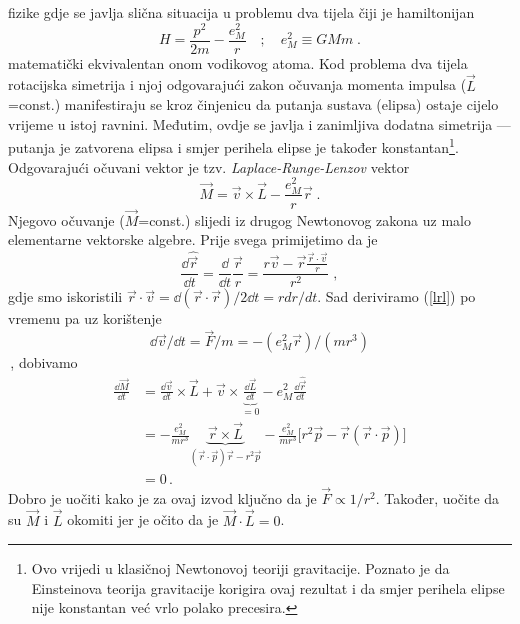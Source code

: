 fizike gdje se javlja slična situacija u problemu dva tijela čiji
je hamiltonijan
\begin{equation}
    H = \frac{p^2}{2m} - \frac{e_{M}^2}{r} \quad ; \quad 
 e_{M}^2 \equiv G M m \;.
\end{equation}
matematički ekvivalentan onom vodikovog atoma.
Kod problema dva tijela rotacijska simetrija i njoj odgovarajući zakon
očuvanja momenta impulsa ($\vec{L}$=const.) manifestiraju se kroz
činjenicu da putanja sustava (elipsa) ostaje cijelo vrijeme u istoj
ravnini.  Međutim, ovdje se javlja i zanimljiva dodatna simetrija ---
putanja je zatvorena elipsa i
smjer perihela elipse je također konstantan\footnote{Ovo
vrijedi u klasičnoj Newtonovoj teoriji gravitacije. Poznato je da
Einsteinova teorija gravitacije korigira ovaj rezultat i da smjer perihela
elipse nije konstantan već vrlo polako precesira.}.
Odgovarajući očuvani vektor je tzv. \emph{Laplace-Runge-Lenzov}
vektor
\begin{equation}
  \vec{M} = \vec{v}\times\vec{L} - \frac{e_{M}^2}{r}\vec{r} \;.
\label{lrl}
\end{equation}
Njegovo očuvanje ($\vec{M}$=const.) slijedi iz drugog Newtonovog
zakona uz malo elementarne vektorske algebre.
Prije svega primijetimo da je
\begin{displaymath}
 \frac{\dd \hat{\vec{r}}}{\dd t} = \frac{\dd}{\dd t} \frac{\vec{r}}{r} =
 \frac{r \vec{v} - \vec{r}
\frac{\vec{r}\cdot\vec{v}}{r}}{r^2} \;,
\end{displaymath}
gdje smo iskoristili $\vec{r}\cdot\vec{v} = \dd (\vec{r}\cdot\vec{r})/2\dd t
= r dr/dt $.
Sad deriviramo (\ref{lrl}) po vremenu pa uz korištenje 
\[ \dd \vec{v}/ \dd t = \vec{F}/m = - (e_{M}^2 \vec{r})/(mr^3) \] \,,
dobivamo
\begin{displaymath}
\begin{split}
\frac{\dd \vec{M}}{\dd t} &=
\frac{\dd \vec{v}}{\dd t} \times \vec{L} + \vec{v}\times
\underbrace{\frac{\dd \vec{L}}{\dd t}}_{=0} - e_{M}^2 \frac{\dd \hat{\vec{r}}}
{\dd t} \\
&= -\frac{e_{M}^2}{mr^3} \underbrace{\vec{r}\times\vec{L}}_{(\vec{r}\cdot 
\vec{p})\vec{r} - r^2 \vec{p}} -
    \frac{e_{M}^2}{mr^3} \Big[ r^2\vec{p} - \vec{r}(\vec{r}\cdot\vec{p})\Big] \\
&= 0 \,.
\end{split}
\end{displaymath}
Dobro je uočiti kako je za ovaj izvod ključno da je $\vec{F}\propto 1/r^2$.
Također, uočite da su $\vec{M}$ i $\vec{L}$ okomiti jer je očito da je
$\vec{M}\cdot\vec{L}=0$.
